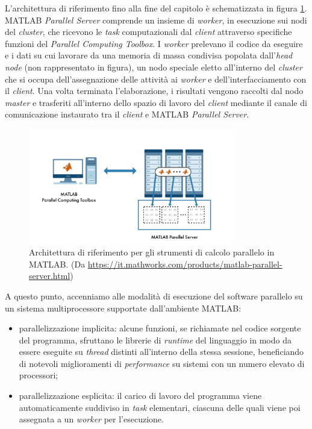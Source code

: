 L'architettura di riferimento fino alla fine del capitolo \`e schematizzata in figura \ref{fig:ArchitetturaRiferimento}.\newline
MATLAB \textit{Parallel Server} comprende un insieme di \textit{worker}, in esecuzione sui nodi del \textit{cluster}, che ricevono le 
\textit{task} computazionali dal \textit{client} attraverso specifiche funzioni del \textit{Parallel Computing Toolbox}. \newline
I \textit{worker} prelevano il codice da eseguire e i dati su cui lavorare da una memoria di massa condivisa popolata dall'\textit{head node} (non rappresentato in figura), un nodo speciale eletto all'interno del \textit{cluster} che si occupa dell'assegnazione delle attivit\`a ai \textit{worker} e dell'interfacciamento con il \textit{client}.\newline
Una volta terminata l'elaborazione, i risultati vengono raccolti dal nodo \textit{master} e trasferiti all'interno dello spazio di lavoro del \textit{client} mediante il canale di comunicazione instaurato tra il \textit{client} e MATLAB \textit{Parallel Server}.

\begin{figure}[htbp]
    \centering
    \includegraphics[width=0.8\textwidth]{../Immagini/Capitolo 2/ReferenceArchitecture.png}
    \caption{Architettura di riferimento per gli strumenti di calcolo parallelo in MATLAB. \small{(Da \url{https://it.mathworks.com/products/matlab-parallel-server.html})}}
    \label{fig:ArchitetturaRiferimento}
\end{figure}

A questo punto, accenniamo alle modalit\`a di esecuzione del software parallelo su un sistema multiprocessore supportate dall'ambiente MATLAB:
\begin{itemize}
    \item parallelizzazione implicita: alcune funzioni, se richiamate nel codice sorgente del programma, sfruttano le librerie di \textit{runtime} del linguaggio in modo da essere 
    eseguite su \textit{thread} distinti all'interno della stessa sessione, beneficiando di notevoli miglioramenti di \textit{performance} su sistemi con un numero elevato 
    di processori;
    \item parallelizzazione esplicita: il carico di lavoro del programma viene automaticamente suddiviso in \textit{task} elementari, ciascuna delle quali viene poi assegnata a un \textit{worker} per l'esecuzione.
\end{itemize}

